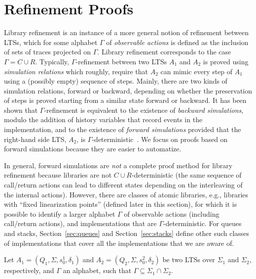 \vspace{-3.5mm}
\section{Refinement Proofs}
\vspace{-1.5mm}
Library refinement is an instance of a more general notion of refinement between LTSs,
which for some alphabet $\Gamma$ of \emph{observable actions} is defined as the inclusion of sets of 
traces projected on $\Gamma$. Library refinement corresponds to the case $\Gamma=C\cup R$. 
Typically, $\Gamma$-refinement between two LTSs $A_1$ and $A_2$ is proved using \emph{simulation relations} which roughly, require that 
$A_2$ can mimic every step of $A_1$ using a (possibly empty) sequence of steps. Mainly, there are two kinds of simulation
relations, forward or backward, depending on whether the preservation of steps is proved starting from a similar state
forward or backward. It has been shown
that $\Gamma$-refinement is equivalent to the existence of \emph{backward simulations}, modulo the addition of history variables
that record events in the implementation, and to the existence of \emph{forward simulations} provided that the right-hand side
LTS, $A_2$, is $\Gamma$-deterministic~\cite{DBLP:journals/tcs/AbadiL91,DBLP:journals/iandc/LynchV95}. 
We focus on proofs based on forward simulations because they are easier to automatize.


In general, forward simulations are \emph{not} a complete proof method for library refinement because libraries are not 
$C\cup R$-deterministic (the same sequence of call/return actions can lead to different states depending on the interleaving of the internal actions).
However, there are classes of atomic libraries, e.g., libraries with ``fixed linearization points'' (defined later in this section), 
for which it is possible to identify a larger alphabet $\Gamma$ of observable actions (including call/return actions), 
and implementations that are $\Gamma$-deterministic. For queues and stacks, 
Section~\ref{sec:queues} and Section~\ref{sec:stacks} define other such classes of implementations that cover
all the implementations that we are aware of.

Let $A_1=(Q_1,\Sigma, s_0^1, \delta_1)$ and $A_2=(Q_2,\Sigma, s_0^2, \delta_2)$ be two LTSs over $\Sigma_1$ and $\Sigma_2$, respectively, and $\Gamma$ an alphabet, such that $\Gamma\subseteq \Sigma_1\cap\Sigma_2$. 

